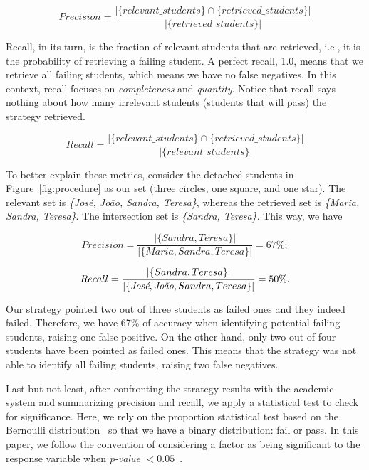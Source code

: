 \vspace{0.1cm}
$$
Precision = \frac{| \{relevant\_students\} \cap \{retrieved\_students\} |}{| \{retrieved\_students\} |}
$$
\vspace{0.1cm}

Recall, in its turn, is the fraction of relevant students that are retrieved, i.e., it is the probability of retrieving a failing student. A perfect recall, 1.0, means that we retrieve all failing students, which means we have no false negatives. In this context, recall focuses on \textit{completeness} and \textit{quantity}. Notice that recall says nothing about how many irrelevant students (students that will pass) the strategy retrieved.

\vspace{0.1cm}
$$
Recall = \frac{| \{relevant\_students\} \cap \{retrieved\_students\} |}{| \{relevant\_students\} |}
$$
\vspace{0.1cm}

To better explain these metrics, consider the detached students in Figure~\ref{fig:procedure} as our set (three circles, one square, and one star). The relevant set is \textit{\{Jos\'{e}, Jo\~{a}o, Sandra, Teresa\}}, whereas the retrieved set is \textit{\{Maria, Sandra, Teresa\}}. The intersection set is \textit{\{Sandra, Teresa\}}. This way, we have

\vspace{0.2cm}
\noindent
\scriptsize
\begin{minipage}{.5\linewidth}
\centering
$$
Precision = \frac{|\{Sandra, Teresa\}|}{|\{Maria, Sandra, Teresa\}|} = 67\%;
$$
\end{minipage}
\begin{minipage}{.5\linewidth}
$$
Recall = \frac{|\{Sandra, Teresa\}|}{|\{\textit{\text{Jos\'{e}}}, \textit{\text{Jo\~{a}o}}, Sandra, Teresa\}|} = 50\%.
$$
\end{minipage}
\normalsize
\vspace{0.2cm}

Our strategy pointed two out of three students as failed ones and they indeed failed. Therefore, we have 67\% of accuracy when identifying potential failing students, raising one false positive. On the other hand, only two out of four students have been pointed as failed ones. This means that the strategy was not able to identify all failing students, raising two false negatives.

Last but not least, after confronting the strategy results with the academic system and summarizing precision and recall, we apply a statistical test to check for significance. Here, we rely on the proportion statistical test based on the Bernoulli distribution~\cite{} so that we have a binary distribution: fail or pass. In this paper, we follow the convention of considering a factor as being significant to the response variable when \textit{p-value} $< 0.05$~\cite{}.


